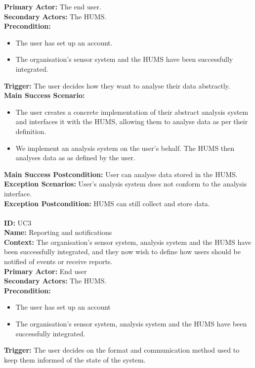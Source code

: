 \documentclass[10pt,a4paper]{article}
\begin{document}
\textbf{Primary Actor:} The end user.\\
\textbf{Secondary Actors:} The HUMS.\\
\textbf{Precondition:}
\begin{itemize}
\item The user has set up an account.
\item The organisation's sensor system and the HUMS have been successfully
integrated.
\end{itemize}
\textbf{Trigger:} The user decides how they want to analyse their data
abstractly.\\
\textbf{Main Success Scenario:}
\begin{itemize}
\item The user creates a concrete implementation of their abstract analysis
system and interfaces it with the HUMS, allowing them to analyse data as per
their definition.
\item We implement an analysis system on the user's behalf. The HUMS then
analyses data as as defined by the user.
\end{itemize}
\textbf{Main Success Postcondition:} User can analyse data stored in the HUMS.\\
\textbf{Exception Scenarios:} User's analysis system does not conform to the
analysis interface.\\
\textbf{Exception Postcondition:} HUMS can still collect and store data.\\\\
\noindent \textbf{ID:} UC3\\
\textbf{Name:} Reporting and notifications\\
\textbf{Context:} The organisation's sensor system, analysis system and the HUMS
have been successfully integrated, and they now wish to define how users should
be notified of events or receive reports.\\
\textbf{Primary Actor:} End user\\
\textbf{Secondary Actors:} The HUMS.\\
\textbf{Precondition:}
\begin{itemize}
\item The user has set up an account
\item The organisation's sensor system, analysis system and the HUMS have been
successfully integrated.
\end{itemize}
\textbf{Trigger:} The user decides on the format and communication method used
to keep them informed of the state of the system.\\
\end{document}
